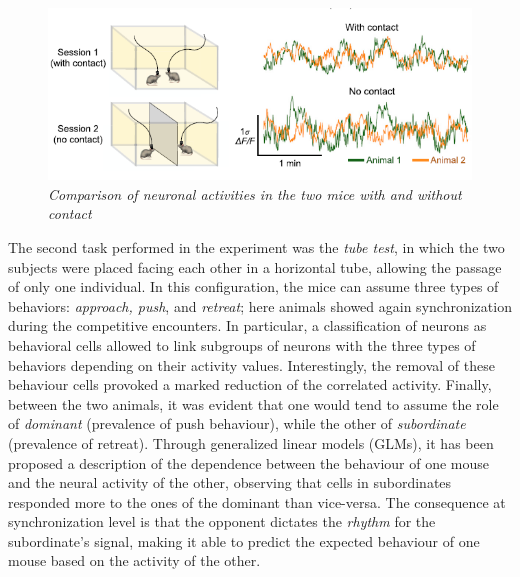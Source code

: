 \documentclass[a4paper]{article}
\begin{document}
\begin{figure}[H]
	\begin{center}
		\includegraphics[scale=.70]{kingsbury.png} 
	\end{center} 
	\caption{\textit{Comparison of neuronal activities in the two mice with and without contact}}
	
\end{figure}


The second task performed in the experiment was the \textit{tube test}, in which the two subjects were placed facing each other in a horizontal tube, allowing the passage of only one individual. In this configuration, the mice can assume three types of behaviors: \textit{approach, push}, and \textit{retreat}; here animals showed again synchronization during the competitive encounters. In particular, a classification of neurons as behavioral cells allowed to link subgroups of neurons with the three types of behaviors depending on their activity values. Interestingly, the removal of these behaviour cells provoked a marked reduction of the correlated activity. Finally, between the two animals, it was evident that one would tend to assume the role of \textit{dominant} (prevalence of push behaviour), while the other of \textit{subordinate} (prevalence of retreat). Through generalized linear models (GLMs), it has been proposed a description of the dependence between the behaviour of one mouse and the neural activity of the other, observing that cells in subordinates responded more to the ones of the dominant than vice-versa. The consequence at synchronization level is that the opponent dictates the \textit{rhythm} for the subordinate's signal, making it able to predict the expected behaviour of one mouse based on the activity of the other.
\end{document}
